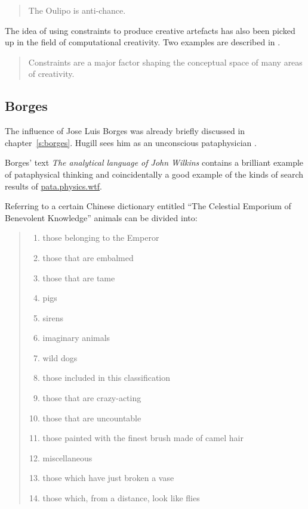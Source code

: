 \begin{quotation}
  The Oulipo is anti-chance. 
\end{quotation}

\spirals

The idea of using constraints to produce creative artefacts has also been picked up in the field of computational creativity. Two examples are described in \autocite{Liapis2013,Toivanen2013}.

\begin{quotation}
  Constraints are a major factor shaping the conceptual space of many areas of creativity. 
\end{quotation}


\subsection{Borges}

The influence of Jose Luis Borges was already briefly discussed in chapter~\ref{s:borges}. Hugill sees him as an unconscious pataphysician \autocite*{Hugill2012}.

Borges' text \textit{The analytical language of John Wilkins} \autocite*{Borges2000} contains a brilliant example of pataphysical thinking and coincidentally a good example of the kinds of search results of \url{pata.physics.wtf}.

Referring to a certain Chinese dictionary entitled ``The Celestial Emporium of Benevolent Knowledge'' animals can be divided into:

\begin{quotation}
\begin{enumerate}
  \item	those belonging to the Emperor
  \item	those that are embalmed
  \item	those that are tame
  \item	pigs
  \item	sirens
  \item	imaginary animals
  \item	wild dogs
  \item	those included in this classification
  \item	those that are crazy-acting
  \item	those that are uncountable
  \item	those painted with the finest brush made of camel hair
  \item	miscellaneous
  \item	those which have just broken a vase
  \item	those which, from a distance, look like flies
\end{enumerate}
\end{quotation}

